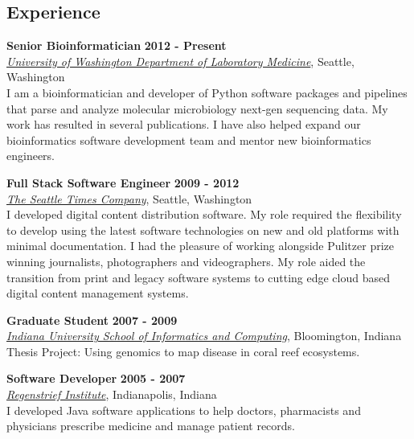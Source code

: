 \documentclass{res}
\begin{document}

\address{Seattle, Washington}
\address{crosenth@gmail.com}

\begin{resume}

\section{Experience}

\textbf{Senior Bioinformatician} \hfill \textbf{2012 - Present}\\
\href{http://depts.washington.edu/labweb/}{\textit{University of Washington Department of Laboratory Medicine}},
Seattle, Washington\\
 I am a bioinformatician and developer of Python software packages and pipelines that parse and analyze molecular microbiology 
 next-gen sequencing data. My work has resulted in several publications. I have also helped expand our bioinformatics 
 software development team and mentor new bioinformatics engineers.

\textbf{Full Stack Software Engineer} \hfill \textbf{2009 - 2012}\\
\href{http://www.seattletimes.com/}{\textit{The Seattle Times Company}}, Seattle, Washington\\
 I developed digital content distribution software. My role required the flexibility to develop using the latest software 
 technologies on new and old platforms with minimal documentation. I had the pleasure of working alongside Pulitzer prize 
 winning journalists, photographers and videographers. My role aided the transition from print and legacy software 
 systems to cutting edge cloud based digital content management systems.

\textbf{Graduate Student} \hfill \textbf{2007 - 2009}\\
\href{https://www.soic.indiana.edu/}{\textit{Indiana University School of Informatics and Computing}}, Bloomington, Indiana\\
Thesis Project: Using genomics to map disease in coral reef ecosystems.

\textbf{Software Developer} \hfill \textbf{2005 - 2007}\\
\href{http://www.regenstrief.org/}{\textit{Regenstrief Institute}}, Indianapolis, Indiana\\
	I developed Java software applications to help doctors, pharmacists and physicians 
  prescribe medicine and manage patient records.


\end{resume}
\end{document}
